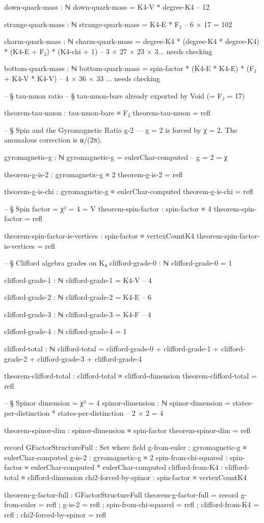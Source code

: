\documentclass[11pt,a4paper]{book}
\begin{document}
\begin{code}
down-quark-mass : ℕ
down-quark-mass = K4-V * degree-K4  -- 12

strange-quark-mass : ℕ
strange-quark-mass = K4-E * F₂  -- 6 × 17 = 102

charm-quark-mass : ℕ
charm-quark-mass = degree-K4 * (degree-K4 * degree-K4) * (K4-E + F₂) * (K4-chi + 1)  -- 3 × 27 × 23 × 3... needs checking

bottom-quark-mass : ℕ
bottom-quark-mass = spin-factor * (K4-E * K4-E) * (F₂ + K4-V * K4-V)  -- 4 × 36 × 33 ... needs checking

-- § tau-muon ratio
-- § tau-muon-bare already exported by Void (= F₂ = 17)

theorem-tau-muon : tau-muon-bare ≡ F₂
theorem-tau-muon = refl

-- § Spin and the Gyromagnetic Ratio g-2 — g = 2 is forced by χ = 2. The anomalous correction is α/(2π).

gyromagnetic-g : ℕ
gyromagnetic-g = eulerChar-computed  -- g = 2 = χ

theorem-g-is-2 : gyromagnetic-g ≡ 2
theorem-g-is-2 = refl

theorem-g-is-chi : gyromagnetic-g ≡ eulerChar-computed
theorem-g-is-chi = refl

-- § Spin factor = χ² = 4 = V
theorem-spin-factor : spin-factor ≡ 4
theorem-spin-factor = refl

theorem-spin-factor-is-vertices : spin-factor ≡ vertexCountK4
theorem-spin-factor-is-vertices = refl

-- § Clifford algebra grades on K₄
clifford-grade-0 : ℕ
clifford-grade-0 = 1

clifford-grade-1 : ℕ
clifford-grade-1 = K4-V  -- 4

clifford-grade-2 : ℕ
clifford-grade-2 = K4-E  -- 6

clifford-grade-3 : ℕ
clifford-grade-3 = K4-F  -- 4

clifford-grade-4 : ℕ
clifford-grade-4 = 1

clifford-total : ℕ
clifford-total = clifford-grade-0 + clifford-grade-1 + clifford-grade-2 + clifford-grade-3 + clifford-grade-4

theorem-clifford-total : clifford-total ≡ clifford-dimension
theorem-clifford-total = refl

-- § Spinor dimension = χ² = 4
spinor-dimension : ℕ
spinor-dimension = states-per-distinction * states-per-distinction  -- 2 × 2 = 4

theorem-spinor-dim : spinor-dimension ≡ spin-factor
theorem-spinor-dim = refl

record GFactorStructureFull : Set where
  field
    g-from-euler : gyromagnetic-g ≡ eulerChar-computed
    g-is-2 : gyromagnetic-g ≡ 2
    spin-from-chi-squared : spin-factor ≡ eulerChar-computed * eulerChar-computed
    clifford-from-K4 : clifford-total ≡ clifford-dimension
    chi2-forced-by-spinor : spin-factor ≡ vertexCountK4

theorem-g-factor-full : GFactorStructureFull
theorem-g-factor-full = record
  { g-from-euler = refl
  ; g-is-2 = refl
  ; spin-from-chi-squared = refl
  ; clifford-from-K4 = refl
  ; chi2-forced-by-spinor = refl }
\end{code}
\end{document}

